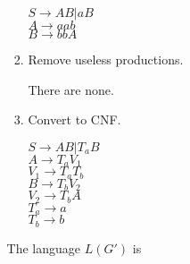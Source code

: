 \documentclass[12pt]{article}
\begin{document}
\begin{spacing}{1.5}
\begin{enumerate}
\begin{enumerate}
\begin{enumerate}
                                          $S \rightarrow AB | aB$ \\
                                          $A \rightarrow aab$ \\
                                          $B \rightarrow bbA$

                                    \item[Step 3:] Remove useless productions.

                                          There are none.

                                    \item[Step 4 and 5:] Convert to CNF.

                                          $S \rightarrow AB | T_aB$ \\
                                          $A \rightarrow T_aV_1$ \\
                                          $V_1 \rightarrow T_aT_b$ \\
                                          $B \rightarrow T_bV_2$ \\
                                          $V_2 \rightarrow T_bA$ \\
                                          $T_a \rightarrow a$ \\
                                          $T_b \rightarrow b$
                              \end{enumerate}

                              The language $L(G')$ is

                  \end{enumerate}

      \end{enumerate}

\end{spacing}
\end{document}
